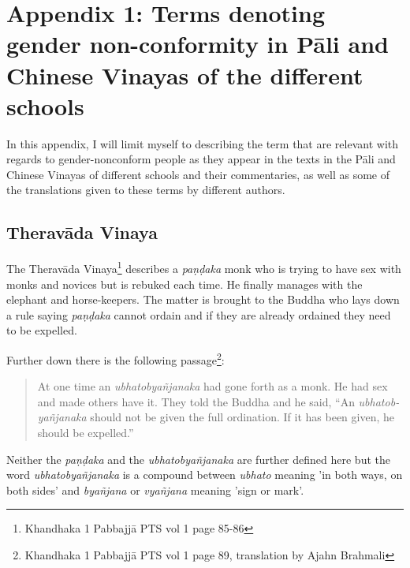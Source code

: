 \section{Appendix 1: Terms denoting gender non-conformity in Pāli and Chinese Vinayas of the different schools}
\label{appendix1}

In this appendix, I will limit myself to describing the term that are relevant with regards to gender-nonconform people as they appear in the texts in the Pāli and Chinese Vinayas of different schools and their commentaries, as well as some of the translations given to these terms by different authors.

\subsection{Theravāda Vinaya}
The Theravāda Vinaya\footnote{Khandhaka 1 Pabbajjā PTS vol 1 page 85-86} describes a {\em paṇḍaka} monk who is trying to have sex with monks and novices but is rebuked each time. He finally manages with the elephant and horse-keepers. The matter is brought to the Buddha who lays down a rule saying {\em paṇḍaka} cannot ordain and if they are already ordained they need to be expelled.

Further down there is the following passage\footnote{Khandhaka 1 Pabbajjā PTS vol 1 page 89, translation by Ajahn Brahmali}:

\begin{quote}
At one time an {\em ubhatob­yañ­janaka} had gone forth as a monk. He had sex and made others have it. They told the Buddha and he said, “An {\em ubhatob­yañ­janaka} should not be given the full ordination. If it has been given, he should be expelled.”
\end{quote}

Neither the {\em paṇḍaka} and the {\em ubhatob­yañ­janaka} are further defined here but the word {\em ubhatob­yañ­janaka} is a compound between {\em ubhato} meaning 'in both ways, on both sides' and {\em byañjana} or {\em vyañjana} meaning 'sign or mark'.

